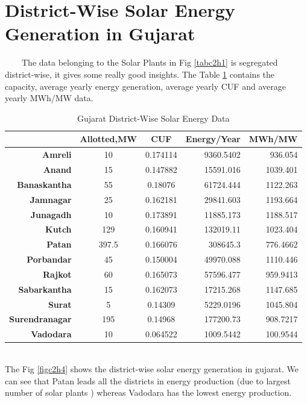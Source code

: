 \section{District-Wise Solar Energy Generation in Gujarat}
\
\
\
\
The data belonging to the Solar Plants in Fig \ref{tabc2h1} is segregated district-wise, it gives some really good insights. The Table \ref{tabc2h2} contains the capacity, average yearly energy generation, average yearly CUF and average yearly MWh/MW data.
\\ 
\begin{table}[H]
  \centering
\caption{Gujarat District-Wise Solar Energy Data}
    \begin{tabular}{|r|c|c|r|r|}
    \hline
       & \textbf{Allotted,MW} & \textbf{CUF} & \multicolumn{1}{c|}{\textbf{Energy/Year}} & \multicolumn{1}{c|}{\textbf{MWh/MW}} \bigstrut\\
    \hline
    \textbf{Amreli} & 10 & 0.174114 & 9360.5402 & 936.054 \bigstrut\\
    \hline
    \textbf{Anand} & 15 & 0.147882 & 15591.016 & 1039.401 \bigstrut\\
    \hline
    \textbf{Banaskantha} & 55 & 0.18076 & 61724.444 & 1122.263 \bigstrut\\
    \hline
    \textbf{Jamnagar} & 25 & 0.162181 & 29841.603 & 1193.664 \bigstrut\\
    \hline
    \textbf{Junagadh} & 10 & 0.173891 & 11885.173 & 1188.517 \bigstrut\\
    \hline
    \textbf{Kutch} & 129 & 0.160941 & 132019.11 & 1023.404 \bigstrut\\
    \hline
    \textbf{Patan} & 397.5 & 0.166076 & 308645.3 & 776.4662 \bigstrut\\
    \hline
    \textbf{Porbandar} & 45 & 0.150004 & 49970.088 & 1110.446 \bigstrut\\
    \hline
    \textbf{Rajkot} & 60 & 0.165073 & 57596.477 & 959.9413 \bigstrut\\
    \hline
    \textbf{Sabarkantha} & 15 & 0.162073 & 17215.268 & 1147.685 \bigstrut\\
    \hline
    \textbf{Surat} & 5  & 0.14309 & 5229.0196 & 1045.804 \bigstrut\\
    \hline
    \textbf{Surendranagar} & 195 & 0.14968 & 177200.73 & 908.7217 \bigstrut\\
    \hline
    \textbf{Vadodara} & 10 & 0.064522 & 1009.5442 & 100.9544 \bigstrut\\
    \hline
    \end{tabular}%

    \label{tabc2h2}%

\end{table}
\\
The Fig \ref{figc2h4} shows the district-wise solar energy generation in gujarat. We can see that Patan leads all the districts in energy production (due to largest number of solar plants ) whereas Vadodara has the lowest energy production.
\\

